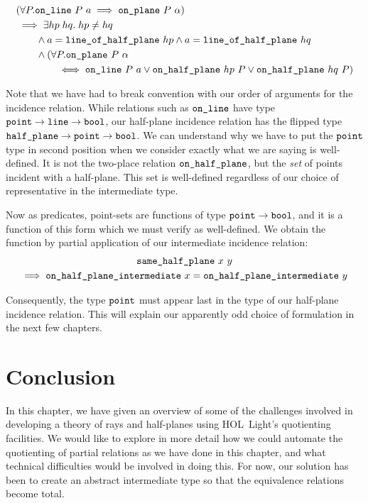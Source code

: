 \begin{equation}\label{eq:HalfPlaneCover}
  \begin{split}
    &(\forall P. \code{on\_line}\ P\ a \implies \code{on\_plane}\ P\ \alpha)\\
    &\implies \exists hp\; hq.\; hp \neq hq\\
    &\qquad \wedge a = \code{line\_of\_half\_plane}\ hp \wedge a = \code{line\_of\_half\_plane}\ hq\\
    &\qquad \wedge (\forall P. \code{on\_plane}\ P\ \alpha\\
    &\qquad\qquad \iff \code{on\_line}\ P\ a \vee \code{on\_half\_plane}\ hp\ P \vee \code{on\_half\_plane}\ hq\ P)
  \end{split}
\end{equation}

Note that we have had to break convention with our order of arguments for the incidence relation. While relations such as $\texttt{on\_line}$ have type $\texttt{point}\rightarrow\texttt{line}\rightarrow\texttt{bool}$, our half-plane incidence relation has the flipped type $\texttt{half\_plane}\rightarrow\texttt{point}\rightarrow\texttt{bool}$. We can understand why we have to put the $\texttt{point}$ type in second position when we consider exactly what we are saying is well-defined. It is not the two-place relation $\texttt{on\_half\_plane}$, but the \emph{set} of points incident with a half-plane. This set is well-defined regardless of our choice of representative in the intermediate type.

Now as predicates, point-sets are functions of type $\texttt{point} \rightarrow \texttt{bool}$, and it is a function of this form which we must verify as well-defined. We obtain the function by partial application of our intermediate incidence relation:
\begin{multline}
\texttt{same\_half\_plane}\ x\ y\\ \implies \texttt{on\_half\_plane\_intermediate}\ x = \texttt{on\_half\_plane\_intermediate}\ y
\end{multline}

Consequently, the type $\texttt{point}$ must appear last in the type of our half-plane incidence relation. This will explain our apparently odd choice of formulation in the next few chapters.

\section{Conclusion}
In this chapter, we have given an overview of some of the challenges involved in developing a theory of rays and half-planes using HOL~Light's quotienting facilities. We would like to explore in more detail how we could automate the quotienting of partial relations as we have done in this chapter, and what technical difficulties would be involved in doing this. For now, our solution has been to create an abstract intermediate type so that the equivalence relations become total.


